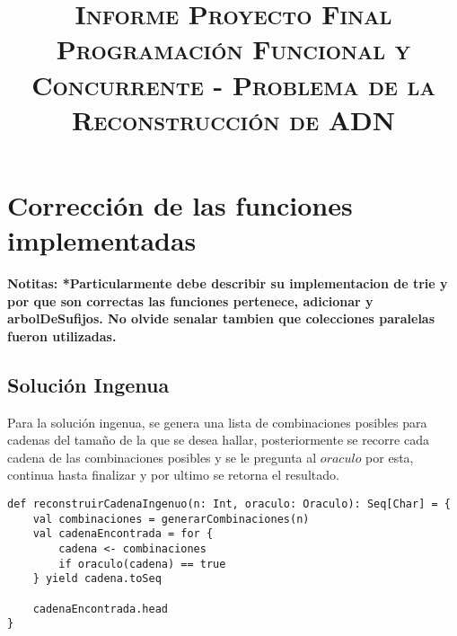 \documentclass[conference]{IEEEtran}
\begin{document}
\title{\huge \textsc{Informe Proyecto Final Programación Funcional y Concurrente - Problema de la Reconstrucción de ADN}\\
}

\author{
\and
{}
}

\maketitle




\section{\textbf{Corrección de las funciones implementadas}}

\textbf{Notitas: *Particularmente debe describir su implementacion
de trie y por que son correctas las funciones pertenece, adicionar y arbolDeSufijos. No
olvide senalar tambien que colecciones paralelas fueron utilizadas.}

\subsection{\textbf{Solución Ingenua}}

Para la solución ingenua, se genera una lista de combinaciones posibles para cadenas del tamaño de la que se desea hallar, posteriormente se recorre cada cadena de las combinaciones posibles y se le pregunta al $oraculo$ por esta, continua hasta finalizar y por ultimo se retorna el resultado.

\begin{lstlisting}
def reconstruirCadenaIngenuo(n: Int, oraculo: Oraculo): Seq[Char] = {
    val combinaciones = generarCombinaciones(n)
    val cadenaEncontrada = for {
        cadena <- combinaciones
        if oraculo(cadena) == true
    } yield cadena.toSeq
    
    cadenaEncontrada.head
}
\end{lstlisting}
\end{document}
